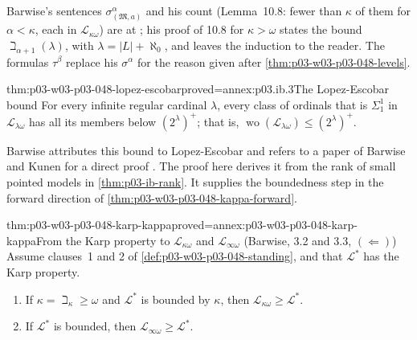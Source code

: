 Barwise's sentences \(\sigma^{\alpha}_{(\mathfrak M,a)}\) and his count
(Lemma~10.8: fewer than \(\kappa\) of them for \(\alpha<\kappa\), each in
\(\mathcal L_{\kappa\omega}\)) are at \cite[pp.~246--247]{Barwise1974Axioms};
his proof of 10.8 for \(\kappa>\omega\) states the bound
\(\beth_{\alpha+1}(\lambda)\), with \(\lambda=|L|+\aleph_0\), and leaves the
induction to the reader.  The formulas \(\tau^{\beta}\) replace his
\(\sigma^{\alpha}\) for the reason given after
\cref{thm:p03-w03-p03-048-levels}.



\begin{hbtheorem}{thm:p03-w03-p03-048-lopez-escobar}{proved=annex:p03.ib.3}{The Lopez-Escobar bound}
For every infinite regular cardinal \(\lambda\), every class of ordinals
that is \(\Sigma^1_1\) in \(\mathcal L_{\lambda\omega}\) has all its
members below \((2^{\lambda})^{+}\); that is,
\(\operatorname{wo}(\mathcal L_{\lambda\omega})\leq(2^{\lambda})^{+}\).
\end{hbtheorem}

Barwise attributes this bound to Lopez-Escobar and refers to a paper of
Barwise and Kunen for a direct proof
\cite[Part~II, \S3, proof of 3.2, p.~257]{Barwise1974Axioms}.
The proof here derives it from the rank of small pointed models in
\cref{thm:p03-ib-rank}. It supplies the boundedness step in the forward
direction of \cref{thm:p03-w03-p03-048-kappa-forward}.

\begin{hbtheorem}{thm:p03-w03-p03-048-karp-kappa}{proved=annex:p03-w03-p03-048-karp-kappa}{From the Karp property to \(\mathcal L_{\kappa\omega}\) and \(\mathcal L_{\infty\omega}\) (Barwise, 3.2 and 3.3, \((\Leftarrow)\))}
Assume clauses~1 and 2 of \cref{def:p03-w03-p03-048-standing}, and that
\(\mathcal L^{\ast}\) has the Karp property.
\begin{enumerate}
\item If \(\kappa=\beth_\kappa\geq\omega\) and \(\mathcal L^{\ast}\) is
      bounded by \(\kappa\), then \(\mathcal L_{\kappa\omega}\geq
      \mathcal L^{\ast}\).
\item If \(\mathcal L^{\ast}\) is bounded, then
      \(\mathcal L_{\infty\omega}\geq\mathcal L^{\ast}\).
\end{enumerate}
\end{hbtheorem}

